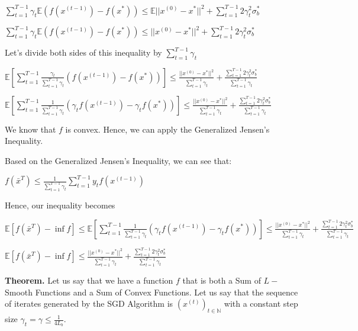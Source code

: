 $\sum_{t=1}^{T - 1} \gamma_t \mathbb{E} (f(x^{(t - 1)}) - f(x^*)) \leq \mathbb{E} ||x^{(0)} - x^*||^2 + \sum_{t=1}^{T - 1} 2 \gamma_t^2 \sigma_b^*$ \newline 

$\sum_{t=1}^{T - 1} \gamma_t \mathbb{E} (f(x^{(t - 1)}) - f(x^*)) \leq  ||x^{(0)} - x^*||^2 +  \sum_{t=1}^{T - 1} 2 \gamma_t^2 \sigma_b^*$ \newline 

Let's divide both sides of this inequality by $\sum_{t = 1}^{T - 1} \gamma_t$ \newline 


$\mathbb{E} [\sum_{t=1}^{T - 1} \frac{\gamma_t}{\sum_{t = 1}^{T - 1} \gamma_t}  (f(x^{(t - 1)}) - f(x^*))] \leq \frac{||x^{(0)} - x^*||^2}{\sum_{t = 1}^{T - 1} \gamma_t} + \frac{\sum_{t=1}^{T - 1} 2 \gamma_t^2 \sigma_b^*}{\sum_{t = 1}^{T - 1} \gamma_t}$ \newline 

$\mathbb{E} [\sum_{t=1}^{T - 1} \frac{1}{\sum_{t = 1}^{T - 1} \gamma_t}  (\gamma_t f(x^{(t - 1)}) - \gamma_t f(x^*))] \leq \frac{||x^{(0)} - x^*||^2}{\sum_{t = 1}^{T - 1} \gamma_t} + \frac{\sum_{t=1}^{T - 1} 2 \gamma_t^2 \sigma_b^*}{\sum_{t = 1}^{T - 1} \gamma_t}$ \newline 


We know that $f$ is convex. Hence, we can apply the Generalized Jensen's Inequality. 

Based on the Generalized Jensen's Inequality, we can see that: \newline 

$f(\bar{x}^T) \leq \frac{1}{\sum_{t = 1}^{T - 1} \gamma_t} \sum_{t=1}^{T - 1} y_t f(x^{(t - 1)})$

Hence, our inequality becomes \newline 

$\mathbb{E} [f(\bar{x}^T) - \inf f] \leq \mathbb{E} [\sum_{t=1}^{T - 1} \frac{1}{\sum_{t = 1}^{T - 1} \gamma_t}  (\gamma_t f(x^{(t - 1)}) - \gamma_t f(x^*))] \leq \frac{||x^{(0)} - x^*||^2}{\sum_{t = 1}^{T - 1} \gamma_t} + \frac{\sum_{t=1}^{T - 1} 2 \gamma_t^2 \sigma_b^*}{\sum_{t = 1}^{T - 1} \gamma_t}$ \newline 

$\mathbb{E} [f(\bar{x}^T) - \inf f] \leq \frac{||x^{(0)} - x^*||^2}{\sum_{t = 1}^{T - 1} \gamma_t} + \frac{\sum_{t=1}^{T - 1} 2 \gamma_t^2 \sigma_b^*}{\sum_{t = 1}^{T - 1} \gamma_t}$ \newline 

\noindent \textbf{Theorem.} Let us say that we have a function $f$ that is both a Sum of $L-$Smooth Functions and a Sum of Convex Functions. Let us say that the sequence of iterates generated by the SGD Algorithm is $(x^{(t)})_{t \in \mathbb{N}}$ with a constant step size $\gamma_t = \gamma \leq \frac{1}{4L_{b}}$.

